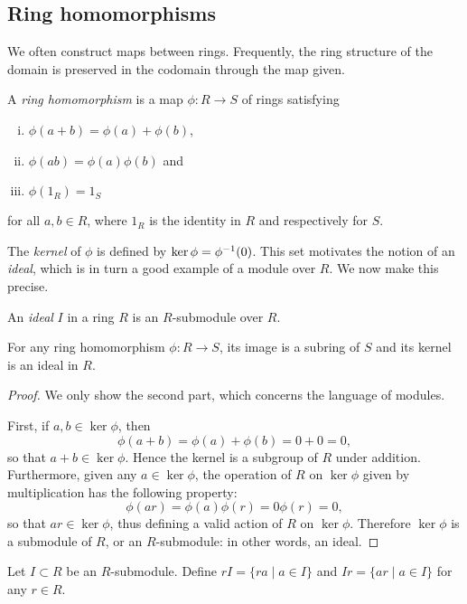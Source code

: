 \subsection{Ring homomorphisms}

We often construct maps between rings. Frequently, the ring structure of the domain is preserved in the codomain through the map given.

\begin{defn}
	A \emph{ring homomorphism} is a map $\phi:R\to S$ of rings satisfying
	\begin{enumerate}[(i)]
		\item $\phi(a+b)=\phi(a)+\phi(b)$,
		\item $\phi(ab)=\phi(a)\phi(b)$ and
		\item $\phi(1_R) = 1_S$
	\end{enumerate}
	for all $a,b\in R$, where $1_R$ is the identity in $R$ and respectively for $S$.
\end{defn}

The \emph{kernel} of $\phi$ is defined by $\ker\phi=\phi^{-1}(0)$. This set motivates the notion of an \emph{ideal}, which is in turn a good example of a module over $R$. We now make this precise.

\begin{defn}
	An \emph{ideal} $I$ in a ring $R$ is an $R$-submodule over $R$.
\end{defn}

\begin{prop}
	For any ring homomorphism $\phi:R\to S$, its image is a subring of $S$ and its kernel is an ideal in $R$.
\end{prop}
\begin{proof}
	We only show the second part, which concerns the language of modules.

	First, if $a,b\in\ker\phi$, then
	\[
		\phi(a+b) = \phi(a)+\phi(b) = 0 + 0 = 0,
	\]
	so that $a+b\in\ker\phi$. Hence the kernel is a subgroup of $R$ under addition. Furthermore, given any $a\in\ker\phi$, the operation of $R$ on $\ker\phi$ given by multiplication has the following property:
	\[
		\phi(ar) = \phi(a)\phi(r) = 0\phi(r) = 0,
	\]
	so that $ar\in\ker\phi$, thus defining a valid action of $R$ on $\ker\phi$. Therefore $\ker\phi$ is a submodule of $R$, or an $R$-submodule: in other words, an ideal.
\end{proof}

\begin{defn}
	Let $I\subset R$ be an $R$-submodule. Define $rI=\{ra \mid a\in I\}$ and $Ir=\{ar \mid a\in I\}$ for any $r\in R$.
\end{defn}


